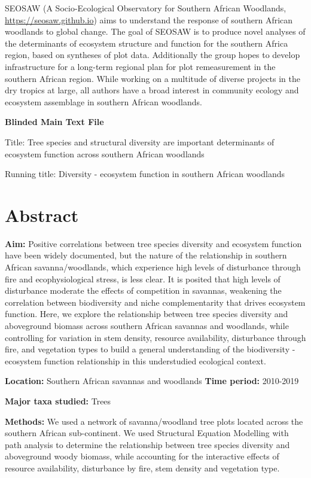\documentclass[11pt,a4paper]{article}
\begin{document}
SEOSAW (A Socio-Ecological Observatory for Southern African Woodlands, \url{https://seosaw.github.io}) aims to understand the response of southern African woodlands to global change. The goal of SEOSAW is to produce novel analyses of the determinants of ecosystem structure and function for the southern Africa region, based on syntheses of plot data. Additionally the group hopes to develop infrastructure for a long-term regional plan for plot remeasurement in the southern African region. While working on a multitude of diverse projects in the dry tropics at large, all authors have a broad interest in community ecology and ecosystem assemblage in southern African woodlands.

\newpage{}

{\LARGE{\textbf{Blinded Main Text File}}}

\LARGE{Title: Tree species and structural diversity are important determinants of ecosystem function across southern African woodlands}

\normalsize{Running title: Diversity - ecosystem function in southern African woodlands}

\section{Abstract}

\textbf{Aim:} Positive correlations between tree species diversity and ecosystem function have been widely documented, but the nature of the relationship in southern African savanna/woodlands, which experience high levels of disturbance through fire and ecophysiological stress, is less clear. It is posited that high levels of disturbance moderate the effects of competition in savannas, weakening the correlation between biodiversity and niche complementarity that drives ecosystem function. Here, we explore the relationship between tree species diversity and aboveground biomass across southern African savannas and woodlands, while controlling for variation in stem density, resource availability, disturbance through fire, and vegetation types to build a general understanding of the biodiversity - ecosystem function relationship in this understudied ecological context.

\textbf{Location:} Southern African savannas and woodlands
\textbf{Time period:} 2010-2019

\textbf{Major taxa studied:} Trees

\textbf{Methods:} We used a network of \nplots{} savanna/woodland tree plots located across the southern African sub-continent. We used Structural Equation Modelling with path analysis to determine the relationship between tree species diversity and aboveground woody biomass, while accounting for the interactive effects of resource availability, disturbance by fire, stem density and vegetation type.
\end{document}
